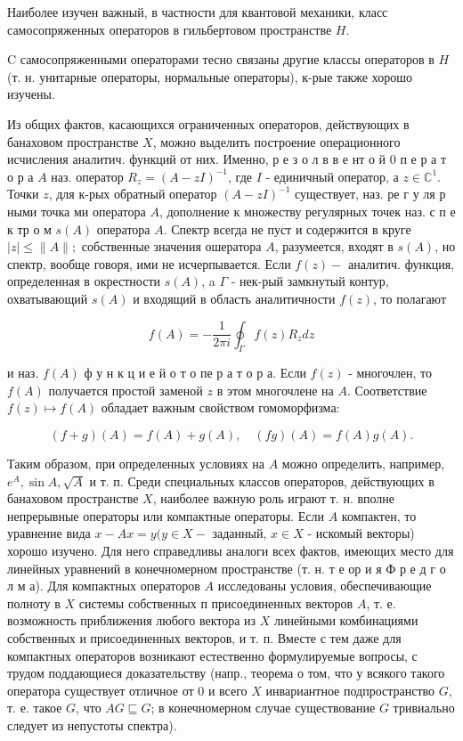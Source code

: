 \documentclass[10pt]{article}
\begin{document}
Наиболее изучен важный, в частности для квантовой механики, класс самосопряженных операторов в гильбертовом пространстве $H$.



C самосопряженными операторами тесно связаны другие классы операторов в $H$ (т. н. унитарные операторы, нормальные операторы), к-рые также хорошо изучены.



Из общих фактов, касающихся ограниченных операторов, действующих в банаховом пространстве $X$, можно выделить построение операционного исчисления аналитич. функций от них. Именно, р е з о л в в е нт о й 0 п е р а т о р а $A$ наз. оператор $R_{z}=(A-z I)^{-1}$, где $I$ - единичный оператор, а $z \in \mathbb{C}^{1}$. Точки $z$, для к-рых обратный оператор $(A-z I)^{-1}$ существует, наз. ре г у ля р ными точка ми оператора $A$, дополнение к множеству регулярных точек наз. с п е к тр о м $s(A)$ оператора $A$. Спектр всегда не пуст и содержится в круге $|z| \leqslant\|A\| ;$ собственные значения ошератора $A$, разумеется, входят в $s(A)$, но спектр, вообще говоря, ими не исчерпывается. Если $f(z)-$ аналитич. функция, определенная в окрестности $s(A)$, a $\Gamma$ - нек-рый замкнутый контур, охватывающий $s(A)$ и входящий в область аналитичности $f(z)$, то полагают



\[

f(A)=-\frac{1}{2 \pi i} \oint_{\Gamma} f(z) R_{z} d z

\]



и наз. $f(A)$ ф у н к ц и е й о т о пе р а т о р а. Если $f(z)$ - многочлен, то $f(A)$ получается простой заменой $z$ в этом многочлене на $A$. Соответствие $f(z) \mapsto f(A)$ обладает важным свойством гомоморфизма:



\[

(f+g)(A)=f(A)+g(A), \quad(f g)(A)=f(A) g(A) .

\]



Таким образом, при определенных условиях на $A$ можно определить, например, $e^{A}, \sin A, \sqrt{A}$ и т. п. Среди специальных классов операторов, действующих в банаховом пространстве $X$, наиболее важную роль играют т. н. вполне непрерывные операторы или компактные операторы. Если $A$ компактен, то уравнение вида $x-A x=y(y \in X-$ заданный, $x \in X$ - искомый векторы) хорошо изучено. Для него справедливы аналоги всех фактов, имеющих место для линейных уравнений в конечномерном пространстве (т. н. т е ор и я Ф р е д г о л м а). Для компактных операторов $A$ исследованы условия, обеспечивающие полноту в $X$ системы собственных п присоединенных векторов $A$, т. е. возможность приближения любого вектора из $X$ линейными комбинациями собственных и присоединенных векторов, и т. п. Вместе с тем даже для компактных операторов возникают естественно формулируемые вопросы, с трудом поддающиеся доказательству (напр., теорема о том, что у всякого такого оператора существует отличное от 0 и всего $X$ инвариантное подпространство $G$, т. е. такое $G$, что $A G \sqsubseteq G$; в конечномерном случае существование $G$ тривиально следует из непустоты спектра).
\end{document}
